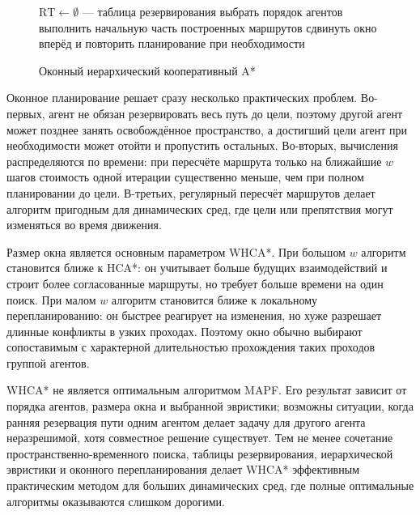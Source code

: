 \begin{figure}
\begin{minipage}{\linewidth}
\begin{algorithm}[H]
    \SetAlgoVlined
    $\mathrm{RT} \leftarrow \emptyset$ --- таблица резервирования\;
    выбрать порядок агентов\;
    выполнить начальную часть построенных маршрутов\;
    сдвинуть окно вперёд и повторить планирование при необходимости\;
\end{algorithm}
\end{minipage}
\caption{Оконный иерархический кооперативный A*}
\label{alg:whca}
\end{figure}

Оконное планирование решает сразу несколько практических проблем. Во-первых, агент не обязан
резервировать весь путь до цели, поэтому другой агент может позднее занять освобождённое пространство,
а достигший цели агент при необходимости может отойти и пропустить остальных. Во-вторых, вычисления
распределяются по времени: при пересчёте маршрута только на ближайшие $w$ шагов стоимость одной
итерации существенно меньше, чем при полном планировании до цели. В-третьих, регулярный пересчёт
маршрутов делает алгоритм пригодным для динамических сред, где цели или препятствия могут изменяться
во время движения.

Размер окна является основным параметром WHCA*. При большом $w$ алгоритм становится ближе к HCA*:
он учитывает больше будущих взаимодействий и строит более согласованные маршруты, но требует больше
времени на один поиск. При малом $w$ алгоритм становится ближе к локальному перепланированию: он
быстрее реагирует на изменения, но хуже разрешает длинные конфликты в узких проходах. Поэтому окно
обычно выбирают сопоставимым с характерной длительностью прохождения таких проходов группой
агентов.

WHCA* не является оптимальным алгоритмом MAPF. Его результат зависит от порядка агентов, размера окна
и выбранной эвристики; возможны ситуации, когда ранняя резервация пути одним агентом делает задачу
для другого агента неразрешимой, хотя совместное решение существует. Тем не менее сочетание
пространственно-временного поиска, таблицы резервирования, иерархической эвристики и оконного
перепланирования делает WHCA* эффективным практическим методом для больших динамических сред, где
полные оптимальные алгоритмы оказываются слишком дорогими.

